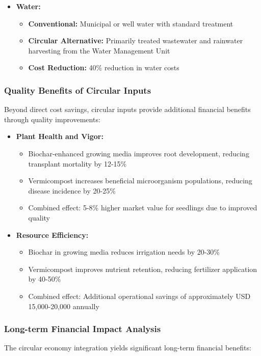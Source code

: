 \begin{itemize}
    \item \textbf{Water:}
    \begin{itemize}
        \item \textbf{Conventional:} Municipal or well water with standard treatment
        \item \textbf{Circular Alternative:} Primarily treated wastewater and rainwater harvesting from the Water Management Unit
        \item \textbf{Cost Reduction:} 40\% reduction in water costs
    \end{itemize}
\end{itemize}

\subsubsection{Quality Benefits of Circular Inputs}
Beyond direct cost savings, circular inputs provide additional financial benefits through quality improvements:

\begin{itemize}
    \item \textbf{Plant Health and Vigor:}
    \begin{itemize}
        \item Biochar-enhanced growing media improves root development, reducing transplant mortality by 12-15\%
        \item Vermicompost increases beneficial microorganism populations, reducing disease incidence by 20-25\%
        \item Combined effect: 5-8\% higher market value for seedlings due to improved quality
    \end{itemize}
    
    \item \textbf{Resource Efficiency:}
    \begin{itemize}
        \item Biochar in growing media reduces irrigation needs by 20-30\%
        \item Vermicompost improves nutrient retention, reducing fertilizer application by 40-50\%
        \item Combined effect: Additional operational savings of approximately USD 15,000-20,000 annually
    \end{itemize}
\end{itemize}

\subsubsection{Long-term Financial Impact Analysis}
The circular economy integration yields significant long-term financial benefits:

